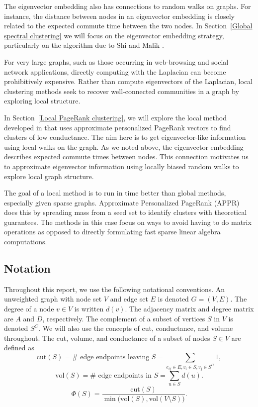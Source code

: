 \documentclass[11pt]{article}
\begin{document}
The eigenvector embedding also has connections to random walks on graphs. For instance, the distance between nodes in an eigenvector embedding is closely related to the expected commute time between the two nodes. In Section~\ref{Global spectral clustering} we will focus on the eigenvector embedding strategy, particularly on the algorithm due to Shi and Malik \cite{shi}.

For very large graphs, such as those occurring in web-browsing and social network applications, directly computing with the Laplacian can become prohibitively expensive. Rather than compute eigenvectors of the Laplacian, local clustering methods seek to recover well-connected communities in a graph by exploring local structure.

In Section~\ref{Local PageRank clustering}, we will explore the local method developed in \cite{pagerank_cluster} that uses approximate personalized PageRank vectors to find clusters of low conductance. The aim here is to get eigenvector-like information using local walks on the graph. As we noted above, the eigenvector embedding describes expected commute times between nodes. This connection motivates us to approximate eigenvector information using locally biased random walks to explore local graph structure.

The goal of a local method is to run in time better than global methods, especially given sparse graphs. Approximate Personalized PageRank (APPR) does this by spreading mass from a seed set to identify clusters with theoretical guarantees. The methods in this case focus on ways to avoid having to do matrix operations as opposed to directly formulating fast sparse linear algebra computations.

\subsection*{Notation}

Throughout this report, we use the following notational conventions. An unweighted graph with node set $V$ and edge set $E$ is denoted $G=(V,E)$. The degree of a node $v\in V$ is written $d(v)$. The adjacency matrix and degree matrix are $A$ and $D$, respectively. The complement of a subset of vertices $S$ in $V$ is denoted $S^C$. We will also use the concepts of cut, conductance, and volume throughout. The cut, volume, and conductance of a subset of nodes $S\in V$ are defined as
$$\text{cut}(S) = \# \text{ edge endpoints leaving } S = \sum_{e_{ij}\in E, v_i\in S, v_j\in S^C} 1,$$
$$\text{vol}(S) = \# \text{ edge endpoints in } S = \sum_{u\in S} d(u).$$
$$\Phi(S) = \frac{\text{cut}(S)}{\min \Big( \text{vol}(S), \text{vol}(V \setminus S) \Big)}.$$
\end{document}
